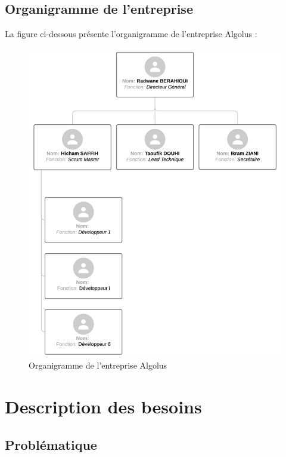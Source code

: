 \documentclass[12pt,a4paper]{report}
\begin{document}
	\subsection{Organigramme de l’entreprise}
	
	La figure ci-dessous présente l'organigramme de l'entreprise Algolus :
	
	\begin{figure}[H]
		\centering
		\includegraphics[width=1\textwidth]{algolus-organigramme.png}
		\caption{Organigramme de l'entreprise Algolus}
		\label{fig:algolus-organigramme}
	\end{figure}
	
	\section{Description des besoins}
	
	\subsection{Problématique}
	
\end{document}
